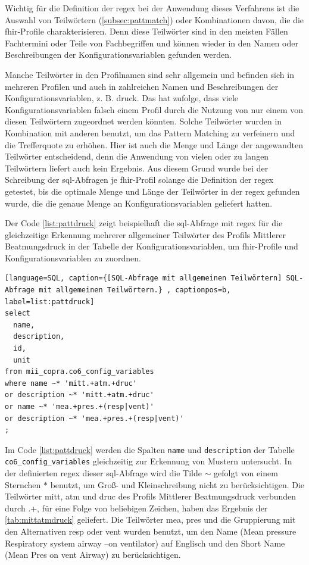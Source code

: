 Wichtig für die Definition der \acs{regex} bei der Anwendung dieses Verfahrens ist die Auswahl von Teilwörtern (\ref{subsec:pattmatch}) oder Kombinationen davon, die die \ac{fhir}-Profile charakterisieren. Denn diese Teilwörter sind in den meisten Fällen Fachtermini oder Teile von Fachbegriffen und können wieder in den Namen oder Beschreibungen der Konfigurationsvariablen gefunden werden.

 Manche Teilwörter in den Profilnamen sind sehr allgemein und befinden sich in mehreren Profilen und auch in zahlreichen Namen und Beschreibungen der Konfigurationsvariablen, z. B. \glqq druck\grqq{}. Das hat zufolge, dass viele Konfigurationsvariablen falsch einem Profil durch die Nutzung von nur einem von diesen Teilwörtern zugeordnet werden könnten. Solche Teilwörter wurden in Kombination mit anderen benutzt, um das Pattern Matching zu verfeinern und die Trefferquote zu erhöhen. Hier ist auch die Menge und Länge der angewandten Teilwörter entscheidend, denn die Anwendung von vielen oder zu langen Teilwörtern liefert auch kein Ergebnis. Aus diesem Grund wurde bei der Schreibung der \ac{sql}-Abfragen je \ac{fhir}-Profil solange die Definition der \ac{regex} getestet, bis die optimale Menge und Länge der Teilwörter in der \ac{regex} gefunden wurde, die die genaue Menge an Konfigurationsvariablen geliefert hatten.

Der Code \ref{list:pattdruck} zeigt beispielhaft die \ac{sql}-Abfrage mit \ac{regex} für die gleichzeitige Erkennung mehrerer allgemeiner Teilwörter des Profils \glqq Mittlerer Beatmungsdruck\grqq{} in der Tabelle der Konfigurationsvariablen, um \ac{fhir}-Profile und Konfigurationsvariablen zu zuordnen.
\begin{lstlisting}[language=SQL, caption={[SQL-Abfrage mit allgemeinen Teilwörtern] SQL-Abfrage mit allgemeinen Teilwörtern.} , captionpos=b, label=list:pattdruck]
select 
  name, 
  description, 
  id, 
  unit
from mii_copra.co6_config_variables 
where name ~* 'mitt.+atm.+druc'
or description ~* 'mitt.+atm.+druc'
or name ~* 'mea.+pres.+(resp|vent)'
or description ~* 'mea.+pres.+(resp|vent)'
;
\end{lstlisting}

Im Code \ref{list:pattdruck} werden die Spalten \texttt{name} und \texttt{description} der Tabelle \texttt{co6\_config\_variables} gleichzeitig zur Erkennung von Mustern untersucht. In der definierten \ac{regex} dieser \ac{sql}-Abfrage wird die Tilde \glqq$\sim$\grqq{} gefolgt von einem Sternchen \glqq$\ast$\grqq{} benutzt, um Groß- und Kleinschreibung nicht zu berücksichtigen. Die Teilwörter \glqq mitt\grqq{}, \glqq atm\grqq{} und \glqq druc\grqq{} des Profils \glqq Mittlerer Beatmungsdruck\grqq{} verbunden durch \glqq .+\grqq{}, für eine Folge von beliebigen Zeichen, haben das Ergebnis der \ref{tab:mittatmdruck} geliefert. Die Teilwörter \glqq mea\grqq{}, \glqq pres\grqq{} und die Gruppierung mit den Alternativen \glqq resp\grqq{} oder \glqq vent \grqq{} wurden benutzt, um den Name (Mean pressure Respiratory system airway --on ventilator) auf Englisch und den \glqq Short Name\grqq{} (Mean Pres on vent Airway) zu berücksichtigen.

